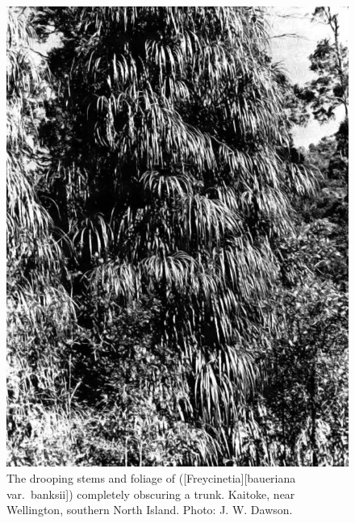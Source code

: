 \begin{figure}[t]
	\begin{minipage}[t]{\textwidth}
		\begin{minipage}[t]{(\textwidth-\fgap) * \real{0.512}}
			\centering
			\includegraphics[width=\textwidth]{graphics/fig_032}
			\caption[The drooping stems and foliage of kiekie]{The drooping stems and foliage of  ([Freycinetia][baueriana var.\ banksii]) completely obscuring a  trunk. Kaitoke, near Wellington, southern North Island. Photo: J. W. Dawson.}%
			\label{fig:32kiekie}
		\end{minipage}\hspace{\fgap}%
		\begin{minipage}[t]{(\textwidth-\fgap) * \real{0.488}}
			\centering

\end{minipage}
\end{minipage}
\end{figure}
